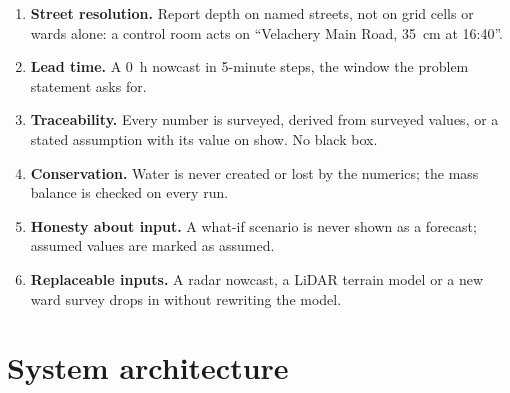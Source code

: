 \documentclass[11pt,a4paper]{article}
\begin{document}
\begin{enumerate}[label=\textbf{G\arabic*.}]
  \item \textbf{Street resolution.} Report depth on named streets, not on grid cells or
        wards alone: a control room acts on ``Velachery Main Road, 35~cm at 16:40''.
  \item \textbf{Lead time.} A 0~h nowcast in 5-minute steps, the window the
        problem statement asks for.
  \item \textbf{Traceability.} Every number is surveyed, derived from surveyed values, or
        a stated assumption with its value on show. No black box.
  \item \textbf{Conservation.} Water is never created or lost by the numerics; the mass
        balance is checked on every run.
  \item \textbf{Honesty about input.} A what-if scenario is never shown as a forecast;
        assumed values are marked as assumed.
  \item \textbf{Replaceable inputs.} A radar nowcast, a LiDAR terrain model or a new ward
        survey drops in without rewriting the model.
\end{enumerate}

\section{System architecture}
\end{document}
